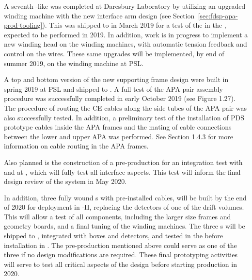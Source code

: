 A seventh -like  was completed at Daresbury Laboratory by utilizing an upgraded winding machine with the new interface arm design (see Section~\ref{sec:fdsp-apa-prod-tooling}). This  was shipped to  in March 2019 for a test of the  in the \coldbox, expected to be performed in 2019. In addition, work is in progress to implement a new winding head on the  winding machines, with automatic tension feedback and control on the wires. These same upgrades will be implemented, by end of summer 2019, on the winding machine at PSL. %

A top and bottom version of the new supporting  frame design were built in spring 2019 at PSL and shipped to .  A full test of the APA pair assembly procedure was successfully completed in early October 2019 (see Figure 1.27). The procedure of routing the CE cables along the side tubes of the APA pair was also successfully tested. In addition, a preliminary test of the installation of PDS prototype cables inside the APA frames and the mating of cable connections between the lower and upper APA was performed.  See Section 1.4.3 for more information on cable routing in the APA frames. 


Also planned is the construction of a pre-production  for an integration test with  and  at , which will fully test all interface aspects. This test will inform the final design review of the  system in May 2020. 

In addition, three fully wound s with pre-installed  cables, will be built by the end of 2020 for deployment in -II, replacing the detectors of one of the drift volumes.  This will allow a test of all  components, including the larger size frames and geometry boards, and a final tuning of the winding machines. The three s will be shipped to , integrated with  boxes and  detectors, and tested in the \coldbox before installation in .  The pre-production  mentioned above could serve as one of the three if no design modifications are required.  These final prototyping activities will serve to test all critical aspects of the  design before starting   production in 2020.  

